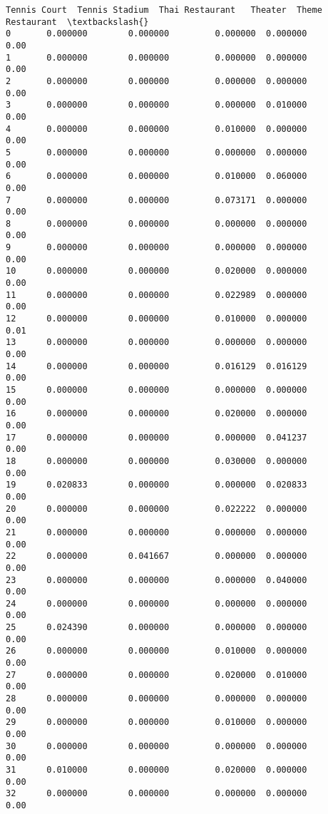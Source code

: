 \documentclass[11pt]{article}
\begin{document}
\begin{tcolorbox}[breakable, size=fbox, boxrule=.5pt, pad at break*=1mm, opacityfill=0]
\begin{Verbatim}[commandchars=\\\{\}]
    Tennis Court  Tennis Stadium  Thai Restaurant   Theater  Theme Restaurant  \textbackslash{}
0       0.000000        0.000000         0.000000  0.000000              0.00
1       0.000000        0.000000         0.000000  0.000000              0.00
2       0.000000        0.000000         0.000000  0.000000              0.00
3       0.000000        0.000000         0.000000  0.010000              0.00
4       0.000000        0.000000         0.010000  0.000000              0.00
5       0.000000        0.000000         0.000000  0.000000              0.00
6       0.000000        0.000000         0.010000  0.060000              0.00
7       0.000000        0.000000         0.073171  0.000000              0.00
8       0.000000        0.000000         0.000000  0.000000              0.00
9       0.000000        0.000000         0.000000  0.000000              0.00
10      0.000000        0.000000         0.020000  0.000000              0.00
11      0.000000        0.000000         0.022989  0.000000              0.00
12      0.000000        0.000000         0.010000  0.000000              0.01
13      0.000000        0.000000         0.000000  0.000000              0.00
14      0.000000        0.000000         0.016129  0.016129              0.00
15      0.000000        0.000000         0.000000  0.000000              0.00
16      0.000000        0.000000         0.020000  0.000000              0.00
17      0.000000        0.000000         0.000000  0.041237              0.00
18      0.000000        0.000000         0.030000  0.000000              0.00
19      0.020833        0.000000         0.000000  0.020833              0.00
20      0.000000        0.000000         0.022222  0.000000              0.00
21      0.000000        0.000000         0.000000  0.000000              0.00
22      0.000000        0.041667         0.000000  0.000000              0.00
23      0.000000        0.000000         0.000000  0.040000              0.00
24      0.000000        0.000000         0.000000  0.000000              0.00
25      0.024390        0.000000         0.000000  0.000000              0.00
26      0.000000        0.000000         0.010000  0.000000              0.00
27      0.000000        0.000000         0.020000  0.010000              0.00
28      0.000000        0.000000         0.000000  0.000000              0.00
29      0.000000        0.000000         0.010000  0.000000              0.00
30      0.000000        0.000000         0.000000  0.000000              0.00
31      0.010000        0.000000         0.020000  0.000000              0.00
32      0.000000        0.000000         0.000000  0.000000              0.00

\end{Verbatim}
\end{tcolorbox}
\end{document}
